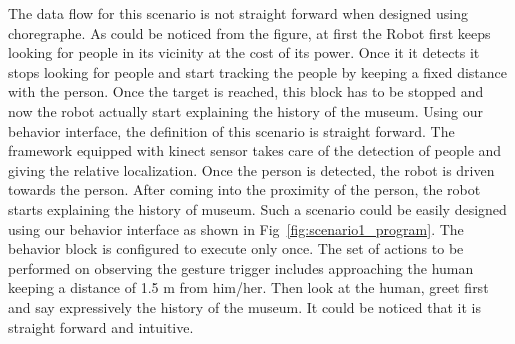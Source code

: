 \documentclass{llncs}
\begin{document}
	The data flow for this scenario is not straight forward when designed using choregraphe. As could be noticed from the figure, at first the Robot first keeps looking for people in its vicinity at the cost of its power. Once it it detects it stops looking for people and start tracking the people by keeping a fixed distance with the person. Once the target is reached, this block has to be stopped and now the robot actually start explaining the history of the museum.
	Using our behavior interface, the definition of this scenario is straight forward. The framework equipped with kinect sensor takes care of the detection of people and giving the relative localization. Once the person is detected, the robot is driven towards the person. After coming into the proximity of the person, the robot starts explaining the history of museum.
 Such a scenario could be easily designed using our behavior interface as shown in Fig~\ref{fig:scenario1_program}. The behavior block is configured to execute only once. The set of actions to be performed on observing the gesture trigger includes approaching the human keeping a distance of 1.5 m from him/her. Then look at the human, greet first and say expressively the  history of the museum. It could be noticed that it is straight forward and intuitive.%
\end{document}
